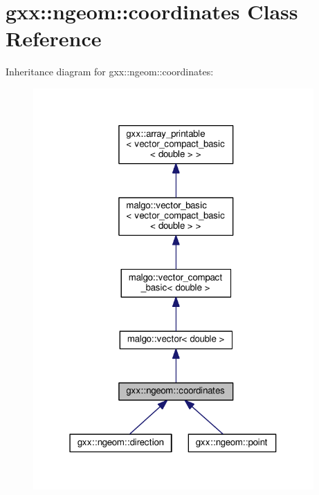 \hypertarget{classgxx_1_1ngeom_1_1coordinates}{}\section{gxx\+:\+:ngeom\+:\+:coordinates Class Reference}
\label{classgxx_1_1ngeom_1_1coordinates}


Inheritance diagram for gxx\+:\+:ngeom\+:\+:coordinates\+:
\nopagebreak
\begin{figure}[H]
\begin{center}
\leavevmode
\includegraphics[width=304pt]{classgxx_1_1ngeom_1_1coordinates__inherit__graph}
\end{center}
\end{figure}


